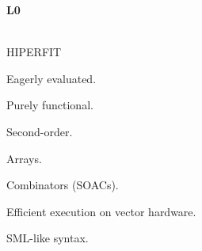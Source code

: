 \begin{frame}[plain]

\textbf{L0}

\ \\

\bi\quad HIPERFIT

\bi\quad Eagerly evaluated.

\bi\quad Purely functional.

\bi\quad Second-order.

\bi\quad Arrays.

\bi\quad Combinators (SOACs).

\bi\quad Efficient execution on vector hardware.

\bi\quad SML-like syntax.

\end{frame}

